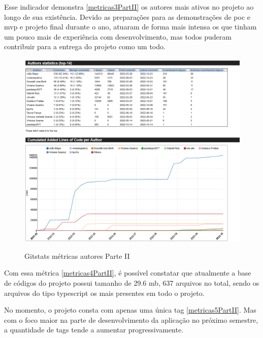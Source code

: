 Esse indicador demonstra \autoref{metricas3PartII} os autores mais ativos no projeto ao longo de sua existência. Devido as preparações para as demonstrações de \ac{poc} e \ac{mvp} e projeto final durante o ano, atuaram de forma mais intensa os que tinham um pouco mais de experiência com desenvolvimento, mas todos puderam contribuir para a entrega do projeto como um todo. 

\begin{figure}[htb]
	\centering
	\caption{\label{fig_arq_virado}Gitstats métricas autores Parte II}
	\includegraphics[width=1.00\textwidth]{anexos/metricas3PartII.png}
	\label{metricas3PartII}
\end{figure}

Com essa métrica  \autoref{metricas4PartII}, é possível constatar que atualmente a base de códigos do projeto possui tamanho de 29.6 \ac{mb}, 637 arquivos no total, sendo os arquivos do tipo typescript os mais presentes em todo o projeto. 

\pagebreak



No momento, o projeto consta com apenas uma única tag \autoref{metricas5PartII}. Mas com o foco maior na parte de desenvolvimento da aplicação no próximo semestre, a quantidade de tags tende a aumentar progressivamente.


